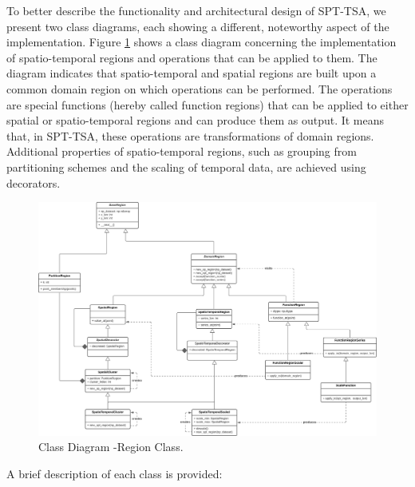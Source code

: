 To better describe the functionality and architectural design of SPT-TSA, we present two class diagrams, each showing a different, noteworthy aspect of the implementation. Figure \ref{Fig:DiagramClasess-Region} shows a class diagram concerning the implementation of spatio-temporal regions and operations that can be applied to them. The diagram indicates that spatio-temporal and spatial regions are built upon a common domain region on which operations can be performed. The operations are special functions (hereby called function regions) that can be applied to either spatial or spatio-temporal regions and can produce them as output. It means that, in SPT-TSA, these operations are transformations of domain regions. Additional properties of spatio-temporal regions, such as grouping from partitioning schemes and the scaling of temporal data, are achieved using decorators.

\begin{figure}[tp]
	\centering
	\includegraphics[scale=0.41, angle=90]{../Figures/SPT-TSA-RegionClasses}
	\caption{Class Diagram -Region Class.}	
	\label{Fig:DiagramClasess-Region}	 		
\end{figure}

A brief description of each class is provided:

